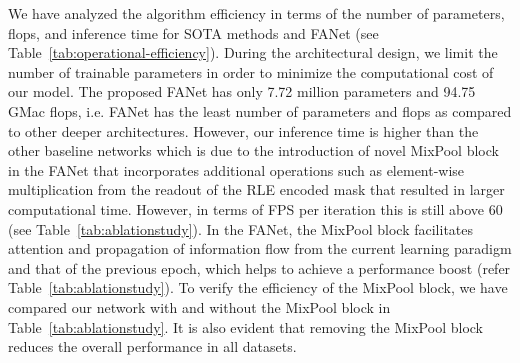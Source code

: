 \documentclass[journal]{IEEEtran}
\begin{document}
We have analyzed the algorithm efficiency in terms of the number of parameters, flops, and inference time for SOTA methods and FANet (see Table~\ref{tab:operational-efficiency}). During the architectural design, we limit the number of trainable parameters in order to minimize the computational cost of our model. The proposed FANet has only {7.72 million} parameters and 94.75 GMac flops, i.e. FANet has the least number of parameters and flops as compared to other deeper architectures. However, our inference time is higher than the other baseline networks which is due to the introduction of novel MixPool block in the FANet that incorporates additional operations such as element-wise multiplication from the readout of the RLE encoded mask that resulted in larger computational time. However, in terms of FPS per iteration this is still above 60 (see Table~\ref{tab:ablationstudy}). In the FANet, the MixPool block facilitates attention and propagation of information flow from the current learning paradigm and that of the previous epoch, which helps to achieve a performance boost (refer Table~\ref{tab:ablationstudy}). To verify the efficiency of the MixPool block, we have compared our network with and without the MixPool block in Table~\ref{tab:ablationstudy}. It is also evident that removing the MixPool block reduces the overall performance in all datasets. 
\end{document}
